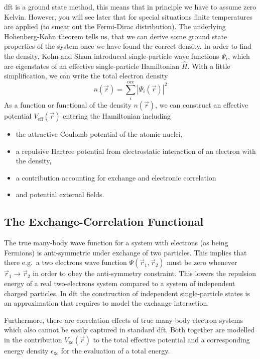 \documentclass[oribibl]{llncs}
\newcommand{\um}[1]{_{\mathrm{#1}}}
\begin{document}
\ac{dft} is a ground state method, this means that in principle we have to
assume zero Kelvin. However, you will see later that for special situations 
finite temperatures are applied (to smear out the Fermi-Dirac distribution).
The underlying Hohenberg-Kohn theorem tells us, that we can derive some 
ground state properties of the system once we have found the correct density.
In order to find the density, Kohn and Sham introduced single-particle wave functions $\Psi_i$, which are eigenstates of an effective single-particle Hamiltonian $\hat H$.
With a little simplification, we can write the total electron density
\begin{equation}
	n(\vec r) = \sum_i^{\mathrm{occ}} \left| \Psi_i(\vec r) \right|^2
	\label{eqn:simplified_density_generation}
\end{equation} 
As a function or functional of the density $n(\vec r)$, we can construct
an effective potential $V\um{eff}(\vec r)$ entering the Hamiltonian
including 
\begin{itemize}
  \item the attractive Coulomb potential of the atomic nuclei,
  \item a repulsive Hartree potential from electrostatic 
  		interaction of an electron with the density,
  \item a contribution accounting for exchange and electronic correlation
  \item and potential external fields.
\end{itemize}

\subsection{The Exchange-Correlation Functional}
The true many-body wave function for a system with electrons (as being Fermions)
is anti-symmetric under exchange of two particles. 
This implies that there e.g.~a two electrons wave function $\Psi(\vec r_1,\vec r_2)$ must be zero whenever $\vec r_1 \rightarrow \vec r_2$ in order to obey
the anti-symmetry constraint.
This lowers the repulsion energy of a real two-electrons system compared to a
system of independent charged particles.
In \ac{dft} the construction of independent single-particle states is an approximation that requires to model the exchange interaction.

Furthermore, there are correlation effects of true many-body electron systems
which also cannot be easily captured in standard \ac{dft}.
Both together are modelled in the contribution $V\um{xc}(\vec r)$ 
to the total effective potential and a corresponding energy density $\epsilon\um{xc}$ for the evaluation of a total energy.
\end{document}
